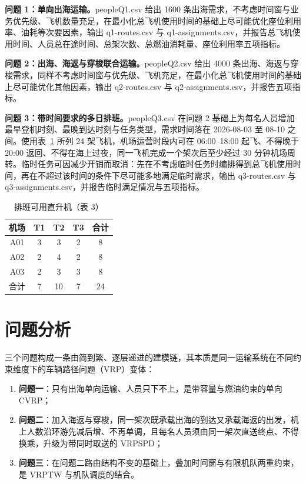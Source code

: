 \documentclass[zihao=-4,a4paper]{ctexart}
\begin{document}
\textbf{问题 1：单向出海运输。}peopleQ1.csv 给出 1600 条出海需求，不考虑时间窗与业务优先级、飞机数量充足，在最小化总飞机使用时间的基础上尽可能优化座位利用率、油耗等次要因素，输出 q1-routes.csv 与 q1-assignments.csv，并报告总飞机使用时间、人员总在途时间、总架次数、总燃油消耗量、座位利用率五项指标。

\textbf{问题 2：出海、海返与穿梭联合运输。}peopleQ2.csv 给出 4000 条出海、海返与穿梭需求，同样不考虑时间窗与优先级、飞机充足，在最小化总飞机使用时间的基础上尽可能优化其他因素，输出 q2-routes.csv 与 q2-assignments.csv，并报告五项指标。

\textbf{问题 3：带时间要求的多日排班。}peopleQ3.csv 在问题 2 基础上为每名人员增加最早登机时刻、最晚到达时刻与任务类型，需求时间落在 2026-08-03 至 08-10 之间。使用表~\ref{tab:fleet} 所列 24 架飞机，机场运营时段内可在 06:00--18:00 起飞、不得晚于 20:00 返回、不得在海上过夜，同一飞机完成一个架次后至少经过 30 分钟机场周转。临时任务可因减少开销而取消：先在不考虑临时任务时编排得到总飞机使用时间，再在不超过该时间的条件下尽可能多地满足临时需求，输出 q3-routes.csv 与 q3-assignments.csv，并报告临时满足情况与五项指标。

\begin{table}[H]
  \centering
  \caption{排班可用直升机（表 3）}
  \label{tab:fleet}
  \begin{tabular}{ccccc}
    \toprule
    机场 & T1 & T2 & T3 & 合计 \\
    \midrule
    A01 & 3 & 3 & 2 & 8 \\
    A02 & 2 & 4 & 2 & 8 \\
    A03 & 2 & 3 & 3 & 8 \\
    \midrule
    合计 & 7 & 10 & 7 & 24 \\
    \bottomrule
  \end{tabular}
\end{table}

\section{问题分析}

三个问题构成一条由简到繁、逐层递进的建模链，其本质是同一运输系统在不同约束维度下的车辆路径问题（VRP）变体：

\begin{enumerate}[itemsep=2pt]
  \item \textbf{问题一}：只有出海单向运输、人员只下不上，是带容量与燃油约束的单向 CVRP；
  \item \textbf{问题二}：加入海返与穿梭，同一架次既承载出海的到达又承载海返的出发，机上人数沿环游先减后增、不再单调，且每名人员须由同一架次直送终点、不得换乘，升级为带同时取送的 VRPSPD；
  \item \textbf{问题三}：在问题二路由结构不变的基础上，叠加时间窗与有限机队两重约束，是 VRPTW 与机队调度的结合。
\end{enumerate}
\end{document}
